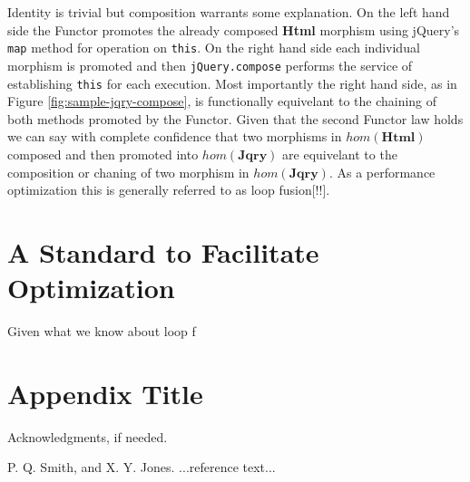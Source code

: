 \documentclass[preprint,10pt]{sigplanconf}
\begin{document}
Identity is trivial but composition warrants some explanation. On the left hand side the Functor promotes the already composed \textbf{Html} morphism using jQuery's \verb|map| method for operation on \verb|this|. On the right hand side each individual morphism is promoted and then \verb|jQuery.compose| performs the service of establishing \verb|this| for each execution. Most importantly the right hand side, as in Figure \ref{fig:sample-jqry-compose}, is functionally equivelant to the chaining of both methods promoted by the Functor. Given that the second Functor law holds we can say with complete confidence that two morphisms in \begin{math}hom(\mathbf{Html})\end{math} composed and then promoted into \begin{math}hom(\mathbf{Jqry})\end{math} are equivelant to the composition or chaning of two morphism in \begin{math}hom(\mathbf{Jqry})\end{math}. As a performance optimization this is generally referred to as loop fusion[!!].

\section{A Standard to Facilitate Optimization}

Given what we know about loop f

\appendix
\section{Appendix Title}
\acks

Acknowledgments, if needed.





\begin{thebibliography}{}
\softraggedright

P. Q. Smith, and X. Y. Jones. ...reference text...

\end{thebibliography}
\end{document}
